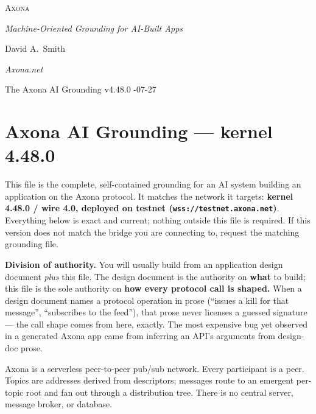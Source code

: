 \documentclass[
  nobib]{tufte-handout}
\author{}
\date{}
\begin{document}
\thispagestyle{empty}
\null\vfill
\begin{center}
{\fontsize{48}{52}\selectfont \textsc{Axona}\par}
\vspace{0.6em}
{\Large\itshape Machine-Oriented Grounding for AI-Built Apps\par}
\vspace{4em}
{\large David A.~Smith\par}
{\itshape\small Axona.net\par}
\vspace{2em}
{\small The Axona AI Grounding \quad v4.48.0 -07-27\par}
\end{center}
\vfill
\null
\newpage
\pagestyle{ndhtplain}
\thispagestyle{ndhtplain}
\setcounter{page}{1}

\section{Axona AI Grounding --- kernel
4.48.0}\label{axona-ai-grounding-kernel-4.48.0}

This file is the complete, self-contained grounding for an AI system
building an application on the Axona protocol. It matches the network it
targets: \textbf{kernel 4.48.0 / wire 4.0, deployed on testnet
(\texttt{wss://testnet.axona.net})}. Everything below is exact and
current; nothing outside this file is required. If this version does not
match the bridge you are connecting to, request the matching grounding
file.

\textbf{Division of authority.} You will usually build from an
application design document \emph{plus} this file. The design document
is the authority on \textbf{what} to build; this file is the sole
authority on \textbf{how every protocol call is shaped.} When a design
document names a protocol operation in prose (``issues a kill for that
message'', ``subscribes to the feed''), that prose never licenses a
guessed signature --- the call shape comes from here, exactly. The most
expensive bug yet observed in a generated Axona app came from inferring
an API's arguments from design-doc prose.

Axona is a serverless peer-to-peer pub/sub network. Every participant is
a peer. Topics are addresses derived from descriptors; messages route to
an emergent per-topic root and fan out through a distribution tree.
There is no central server, message broker, or database.
\end{document}
